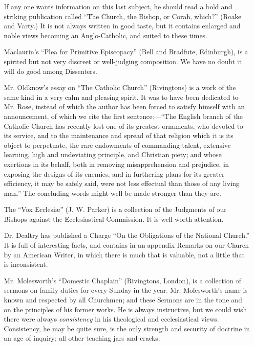 If any one wants information on this last subject,
he should read a bold and striking publication called ``The Church, the
Bishop, or Corah, which?'' (Roake and Varty.) It is not always written in
good taste, but it contains enlarged and noble views becoming an
Anglo-Catholic, and suited to these times.

Maclaurin's ``Plea for Primitive Episcopacy'' (Bell
and Bradfute, Edinburgh), is a spirited but not very discreet or
well-judging composition. We have no doubt it will do good among
Dissenters.

Mr. Oldknow's essay on ``The Catholic Church'' (Rivingtons)
is a work of the same kind in a very calm and pleasing spirit. It was to
have been dedicated to Mr. Rose, instead of which the author has been
forced to satisfy himself with an announcement, of which we cite the
first sentence:—``The English branch of the Catholic Church has
recently lost one of its greatest ornaments, who devoted to its service,
and to the maintenance and spread of that religion which it is its
object to perpetuate, the rare endowments of commanding talent,
extensive learning, high and undeviating principle, and Christian piety;
and whose exertions in its behalf, both in removing misapprehension and
prejudice, in exposing the designs of its enemies, and in furthering
plans for its greater efficiency, it may be safely said, were not less
effectual than those of any living man.'' The concluding words might well
be made stronger than they are.

The ``Vox Ecclesiæ'' (J. W. Parker) is a collection
of the Judgments of our Bishops against the Ecclesiastical Commission.
It is well worth attention.

Dr. Dealtry has published a Charge ``On the
Obligations of the National Church.'' It is full of interesting facts,
and contains in an appendix Remarks on our Church by an American Writer,
in which there is much that is valuable, not a little that is
inconsistent.

Mr. Molesworth's ``Domestic Chaplain'' (Rivingtons,
London), is a collection of sermons on family duties for every Sunday in
the year. Mr. Molesworth's name is known and respected by all Churchmen;
and these Sermons are in the tone and on the principles of his former
works. He is always instructive, but we could wish there were always \emph{consistency}
in his theological and ecclesiastical views. Consistency, he may be
quite sure, is the only strength and security of doctrine in an age of
inquiry; all other teaching jars and cracks.

